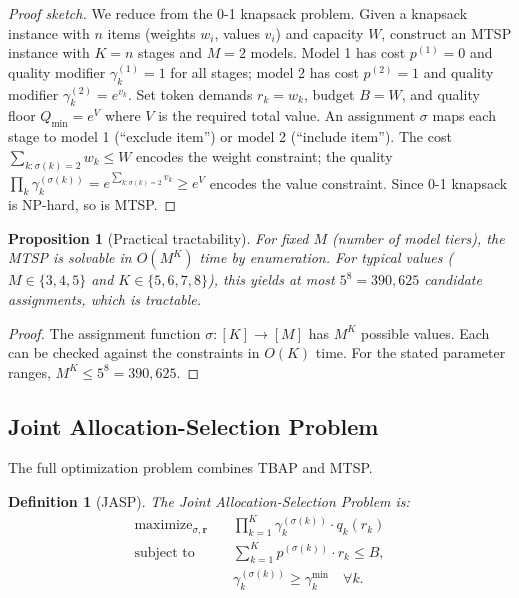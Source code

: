 \documentclass[11pt, a4paper, copyright]{googledeepmind}
\DeclareMathOperator*{\maximize}{maximize}
\newtheorem{definition}{Definition}[section]
\newtheorem{proposition}{Proposition}[section]
\begin{document}
\begin{proof}[Proof sketch]
We reduce from the 0-1 knapsack problem. Given a knapsack instance with $n$ items (weights $w_i$, values $v_i$) and capacity $W$, construct an MTSP instance with $K = n$ stages and $M = 2$ models. Model 1 has cost $p^{(1)} = 0$ and quality modifier $\gamma_k^{(1)} = 1$ for all stages; model 2 has cost $p^{(2)} = 1$ and quality modifier $\gamma_k^{(2)} = e^{v_k}$. Set token demands $r_k = w_k$, budget $B = W$, and quality floor $Q_{\min} = e^{V}$ where $V$ is the required total value. An assignment $\sigma$ maps each stage to model 1 (``exclude item'') or model 2 (``include item''). The cost $\sum_{k: \sigma(k)=2} w_k \leq W$ encodes the weight constraint; the quality $\prod_k \gamma_k^{(\sigma(k))} = e^{\sum_{k: \sigma(k)=2} v_k} \geq e^V$ encodes the value constraint. Since 0-1 knapsack is NP-hard, so is MTSP.
\end{proof}

\begin{proposition}[Practical tractability]\label{prop:tractable}
For fixed $M$ (number of model tiers), the MTSP is solvable in $O(M^K)$ time by enumeration. For typical values ($M \in \{3, 4, 5\}$ and $K \in \{5, 6, 7, 8\}$), this yields at most $5^8 = 390{,}625$ candidate assignments, which is tractable.
\end{proposition}

\begin{proof}
The assignment function $\sigma: [K] \to [M]$ has $M^K$ possible values. Each can be checked against the constraints in $O(K)$ time. For the stated parameter ranges, $M^K \leq 5^8 = 390{,}625$.
\end{proof}

\subsection{Joint Allocation-Selection Problem}

The full optimization problem combines TBAP and MTSP.

\begin{definition}[JASP]\label{def:jasp}
The \emph{Joint Allocation-Selection Problem} is:
\begin{equation}\label{eq:jasp}
\begin{aligned}
    \maximize_{\sigma, \mathbf{r}} \quad & \prod_{k=1}^{K} \gamma_k^{(\sigma(k))} \cdot q_k(r_k) \\
    \text{subject to} \quad & \sum_{k=1}^{K} p^{(\sigma(k))} \cdot r_k \leq B, \\
    & \gamma_k^{(\sigma(k))} \geq \gamma_k^{\min} \quad \forall k.
\end{aligned}
\end{equation}
\end{definition}
\end{document}
